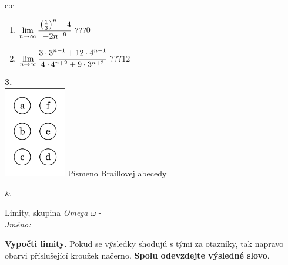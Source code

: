 \documentclass[10pt]{report}
\begin{document}
\begin{tabular}{c:c}
\begin{minipage}[c][104.5mm][t]{0.5\linewidth}
\begin{center}
\begin{minipage}{0.79\linewidth}
\begin{center}
\begin{varwidth}{\linewidth}
\begin{enumerate}
\item $\lim\limits_{n\to\infty}\cfrac{\left(\frac{1}{3}\right)^n +4}{-2n^{-9}}$\quad \dotfill\; ???\;\dotfill \quad $0$
\item $\lim\limits_{n\to\infty}\cfrac{3\cdot 3^{n-1}+12\cdot 4^{n-1}}{4\cdot 4^{n+2}+9\cdot 3^{n+2}}$\quad \dotfill\; ???\;\dotfill \quad $12$
\end{enumerate}
\end{varwidth}
\end{center}
\end{minipage}
\begin{minipage}{0.20\linewidth}
\begin{center}
{\Huge\bfseries 3.} \\[2mm]
\includegraphics[height=40mm]{../images/braille.png}
{\small Písmeno Braillovej abecedy}
\end{center}
\end{minipage}
\end{center}
\end{minipage}
&
\begin{minipage}[c][104.5mm][t]{0.5\linewidth}
\begin{center}
\vspace{7mm}
{\huge Limity, skupina \textit{Omega $\omega$} -}\\[5mm]
\textit{Jméno:}\phantom{xxxxxxxxxxxxxxxxxxxxxxxxxxxxxxxxxxxxxxxxxxxxxxxxxxxxxxxxxxxxxxxxx}\\[5mm]
\begin{minipage}{0.95\linewidth}
\begin{center}
\textbf{Vypočti limity}. Pokud se výsledky shodujú s tými za otazníky, tak napravo\\obarvi příslušející kroužek načerno. \textbf{Spolu odevzdejte výsledné slovo}.
\end{center}
\end{minipage}
\\[1mm]
\begin{minipage}{0.79\linewidth}
\begin{center}
\begin{varwidth}{\linewidth}

\end{varwidth}
\end{center}
\end{minipage}
\end{center}
\end{minipage}
\end{tabular}
\end{document}

